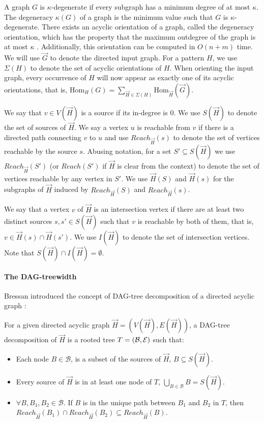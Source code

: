 \documentclass[a4paper,UKenglish,cleveref, autoref, numberwithinsect, thm-restate]{lipics-v2021}
\newcommand{\Hom}[2]{\mathrm{Hom}_{#2}(#1)}
\newcommand{\Reachable}{Reach}
\newcommand{\degen}{\kappa}
\newcommand{\dagtree}{DAG-tree decomposition}
\newcommand{\dagtreewidth}{DAG-treewidth}
\newcommand{\cB}{\mathcal{B}}
\newcommand{\cE}{{\cal E}}
\begin{document}
	A graph $G$ is $\degen$-degenerate if every subgraph has a minimum degree of at most $\degen$. The degeneracy $\degen(G)$ of a graph is the minimum value such that $G$ is $\degen$-degenerate. There exists an acyclic orientation of a graph, called the degeneracy orientation, which has the property that the maximum outdegree of the graph is at most $\degen$ \cite{MaBe83}. Additionally, this orientation can be computed in $O(n+m)$ time. We will use $\vec{G}$ to denote the directed input graph. For a pattern $H$, we use $\Sigma(H)$ to denote the set of acyclic orientations of $H$. When orienting the input graph, every occurrence of $H$ will now appear as exactly one of its acyclic orientations, that is, $\Hom{G}{H} = \sum_{\vec{H} \in \Sigma(H)} \Hom{\vec{G}}{\vec{H}}$.
	
	We say that $v \in V(\vec{H})$ is a source if its in-degree is $0$. We use $S(\vec{H})$ to denote the set of sources of $\vec{H}$. We say a vertex $u$ is reachable from $v$ if there is a directed path connecting $v$ to $u$ and use $\Reachable_{\vec{H}}(s)$ to denote the set of vertices reachable by the source $s$. Abusing notation, for a set $S' \subseteq S(\vec{H})$ we use $\Reachable_{\vec{H}}(S')$ (or $\Reachable(S')$ if $\vec{H}$ is clear from the context) to denote the set of vertices reachable by any vertex in $S'$. We use $\vec{H}(S)$ and $\vec{H}(s)$ for the subgraphs of $\vec{H}$ induced by $\Reachable_{\vec{H}}(S)$ and $\Reachable_{\vec{H}}(s)$. 
	
	We say that a vertex $v$ of $\vec{H}$ is an intersection vertex if there are at least two distinct sources $s,s' \in S(\vec{H})$ such that $v$ is reachable by both of them, that is, $v \in \vec{H}(s) \cap \vec{H}(s')$. We use $I(\vec{H})$ to denote the set of intersection vertices. Note that $S(\vec{H}) \cap I(\vec{H}) = \emptyset$.
	
	\paragraph*{The \dagtreewidth}
	
	Bressan introduced the concept of \dagtree{} of a directed acyclic graph \cite{Br19}:
	
	\begin{definition}[\dagtree{} \cite{Br19}]
		For a given directed acyclic graph $\vec{H} = (V(\vec{H}),E(\vec{H}))$, a \dagtree{} of $\vec{H}$ is a rooted tree $T=(\cB,\cE)$ such that: 
		\begin{itemize}
			\item Each node $B \in \cB$, is a subset of the sources of $\vec{H}$, $B \subseteq S(\vec{H})$.
			\item Every source of $\vec{H}$ is in at least one node of $T$, $\bigcup_{B \in \cB} B = S(\vec{H})$.
			\item $\forall B,B_1,B_2 \in \cB$. If $B$ is in the unique path between $B_1$ and $B_2$ in $T$, then $\Reachable_{\vec{H}}(B_1) \cap \Reachable_{\vec{H}}(B_2) \subseteq \Reachable_{\vec{H}}(B)$.
		\end{itemize}
	\end{definition}
	
\end{document}
